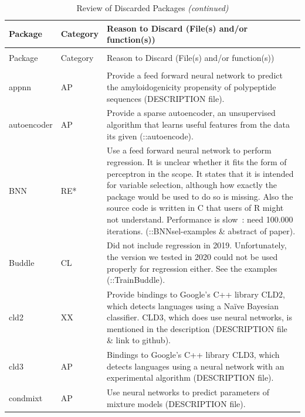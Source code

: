 \begin{Schunk}
\begingroup\fontsize{7}{9}\selectfont

\begin{longtable}[t]{ll>{\raggedright\arraybackslash}p{10cm}}
\caption{\label{tab:Discard:Pkg}Review of Discarded Packages}\\
\toprule
Package & Category & Reason to Discard (File(s) and/or function(s))\\
\midrule
\endfirsthead
\caption[]{Review of Discarded Packages \textit{(continued)}}\\
\toprule
Package & Category & Reason to Discard (File(s) and/or function(s))\\
\midrule
\endhead

\endfoot
\bottomrule
\multicolumn{3}{l}{\rule{0pt}{1em}\textit{Note: } AP=Application, CL=Classification, RE=Regression, RE*=?, TS=Time serie, UT=Utility, XX=Other.}\\
\endlastfoot
appnn & AP & Provide a feed forward neural network to predict the amyloidogenicity propensity of polypeptide sequences (DESCRIPTION file).\\
autoencoder & AP & Provide a sparse autoencoder, an unsupervised algorithm that learns useful features from the data its given (::autoencode).\\
BNN & RE* & Use a feed forward neural network to perform regression. It is unclear whether it fits the form of perceptron in the scope. It states that it is intended for variable selection, although how exactly the package would be used to do so is missing. Also the source code is written in C that users of R might not understand. Performance is slow : need 100.000 iterations. (::BNNsel-examples \& abstract of paper).\\
Buddle & CL & Did not include regression in 2019. Unfortunately, the version we tested in 2020 could not be used properly for regression either. See the examples (::TrainBuddle).\\
cld2 & XX & Provide bindings to Google's C++ library CLD2, which detects languages using a Naïve Bayesian classifier. CLD3, which does use neural networks, is mentioned in the description (DESCRIPTION file \& link to github).\\
\addlinespace
cld3 & AP & Bindings to Google's C++ library CLD3, which detects languages using a neural network with an experimental algorithm (DESCRIPTION file).\\
condmixt & AP & Use neural networks to predict parameters of mixture models (DESCRIPTION file).\\

\end{longtable}
\end{Schunk}
